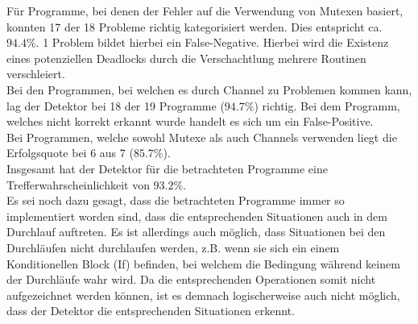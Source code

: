 Für Programme, bei denen der Fehler auf die Verwendung von Mutexen 
basiert, konnten 17 der 18 Probleme richtig kategorisiert werden. 
Dies entspricht ca. $94.4\%$. 1 Problem bildet hierbei ein False-Negative.
Hierbei wird die Existenz eines potenziellen Deadlocks durch die 
Verschachtlung mehrere Routinen verschleiert.\\
Bei den Programmen, bei welchen es durch Channel zu Problemen kommen kann, 
lag der Detektor bei 18 der 19 Programme ($94.7\%$) richtig. Bei dem 
Programm, welches nicht korrekt erkannt wurde handelt es sich um ein False-Positive.\\
Bei Programmen, welche sowohl Mutexe als auch Channels verwenden liegt 
die Erfolgsquote bei 6  aus 7 ($85.7\%$). \\
Insgesamt hat der Detektor für die betrachteten Programme eine 
Trefferwahrscheinlichkeit von $93.2\%$. \\
Es sei noch dazu gesagt, dass die betrachteten Programme immer so implementiert 
worden sind, dass die entsprechenden Situationen auch in dem Durchlauf 
auftreten. Es ist allerdings auch möglich, dass Situationen bei den Durchläufen 
nicht durchlaufen werden, z.B. wenn sie sich ein einem Konditionellen 
Block (If) befinden, bei welchem die Bedingung während keinem der Durchläufe 
wahr wird. Da die entsprechenden Operationen somit nicht aufgezeichnet 
werden können, ist es demnach logischerweise auch nicht möglich, dass der 
Detektor die entsprechenden Situationen erkennt.





